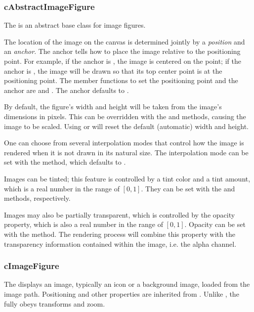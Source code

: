 \subsubsection{cAbstractImageFigure}
\label{sec:graphics:abstractimagefigure}

The  is an abstract base class for image figures.

The location of the image on the canvas is determined jointly by a
\textit{position} and an \textit{anchor}. The anchor tells how to
place the image relative to the positioning point. For example,
if the anchor is , the image is centered on the point;
if the anchor is , the image will be drawn so that its top
center point is at the positioning point. The member functions to set the
positioning point and the anchor are  and
. The anchor defaults to .

By default, the figure's width and height will be taken from the image's
dimensions in pixels. This can be overridden with the  and
 methods, causing the image to be scaled. Using
 or  will reset the default (automatic) width
and height.

One can choose from several interpolation modes that control how the image
is rendered when it is not drawn in its natural size. The interpolation mode
can be set with the  method, which defaults to
.

Images can be tinted; this feature is controlled by a tint color and a tint
amount, which is a real number in the range of $[0,1]$. They can be set with the
 and  methods, respectively.

Images may also be partially transparent, which is controlled by the opacity
property, which is also a real number in the range of $[0,1]$. Opacity can be set with the
 method. The rendering process will combine this
property with the transparency information contained within the image, i.e.
the alpha channel.


\subsubsection{cImageFigure}
\label{sec:graphics:imagefigure}

The  displays an image, typically an icon or a background
image, loaded from the {\opp} image path. Positioning and other properties
are inherited from . Unlike ,
the  fully obeys transforms and zoom.

